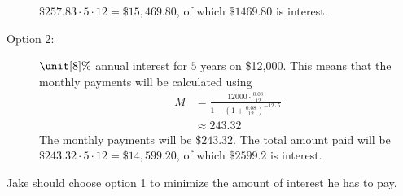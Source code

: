 \begin{problem}
\begin{subproblem}
\begin{shortsolution}
\begin{description}
			$\$257.83\cdot 5\cdot 12=\$15,469.80$, of which $\$1469.80$ is interest.
			\item[Option 2:] $\unit[8]{\%}$ annual interest for $5$ years on \$12,000.
			This means that the monthly payments will be calculated using
			\begin{align*}
				M & = \frac{12000\cdot \frac{0.08}{12}}{1-\left( 1+\frac{0.08}{12} \right)^{-12\cdot 5}} \\
				  & \approx 243.32                                                                       
			\end{align*}
			The monthly payments will be $\$243.32$. The total amount paid 
			will be $\$243.32\cdot 5\cdot 12 =\$14,599.20$, of which $\$2599.2$ is 
			interest.
		\end{description}
		Jake should choose option 1 to minimize the amount of interest 
		he has to pay.
	\end{shortsolution}
\end{subproblem}
\end{problem}

